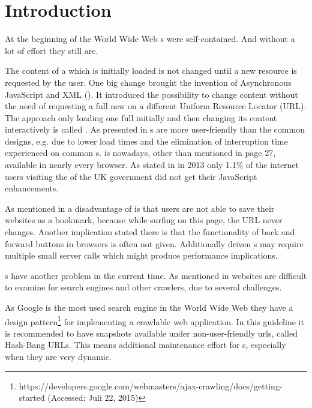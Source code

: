 \section{Introduction}
At the beginning of the World Wide Web \webPage{}s were self-contained. 
And without a lot of effort they still are. 

The content of a \webPage{} which is initially loaded is not changed until a new resource is requested by the user.
One big change brought the invention of Asynchronous JavaScript and XML (\ajax{}).
It introduced the possibility to change content without the need of requesting a full new \webPage{} on a different Uniform Resource Locator (URL).
The approach only loading one full \webPage{} initially and then changing its content interactively is called \singlePageApplication{}.
As presented in \cite{bib:jonsson09} \singlePageApplication{}s are more user-friendly than the common designs, e.g. due to lower load times and the elimination of interruption time experienced on common \webApplication{}s.
\ajax{} is nowadays, other than mentioned in \cite{bib:jonsson09} page 27, available in nearly every browser.
As stated in \cite{bib:gov_uk13} in 2013 only 1.1\% of the internet users visiting the \webSite{} of the UK government did not get their JavaScript enhancements.

As mentioned in \cite{bib:jonsson09} a disadvantage of \ajax{} is that users are not able to save their websites as a bookmark, because while surfing on this page, the URL never changes.
Another implication stated there is that the functionality of back and forward buttons in browsers is often not given.
Additionally \ajax{} driven \webApplication{}s may require multiple small server calls which might produce performance implications.

\SinglePageApplication{}s have another problem in the current time. 
As mentioned in \cite{bib:matter09} \ajax{} websites are difficult to examine for search engines and other crawlers, due to several challenges.

As Google is the most used search engine in the World Wide Web they have a design pattern\footnote{https://developers.google.com/webmasters/ajax-crawling/docs/getting-started (Accessed: Juli 22, 2015)} for implementing a crawlable \ajax{} web application.
In this guideline it is recommended to have snapshots available under non-user-friendly \gls{url}s, called Hash-Bang URLs.
This means additional maintenance effort for \webSite{}s, especially when they are very dynamic.

